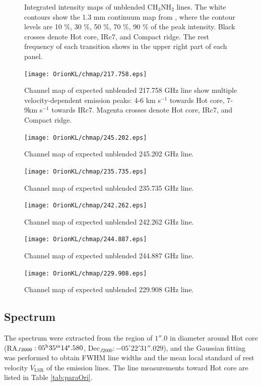 \begin{figure}[H]
\begin{center}
\caption{Integrated intensity maps of unblended CH$_{3}$NH$_{2}$ lines. 
The white contours show the 1.3 mm continuum map from \citet{Hirota+2015},
where the contour levels are 10 \%, 30 \%, 50 \%, 70 \%, 90 \% of the peak intensity.
Black crosses denote Hot core, IRc7, and Compact ridge. 
The rest frequency of each transition shows in the upper right part of each panel.}
\end{center}
\end{figure}

\begin{figure}[H]
  \centering
  \texttt{[image: OrionKL/chmap/217.758.eps]}
  \caption{
  Channel map of expected unblended 217.758 GHz line show multiple velocity-dependent 
  emission peaks: 4-6 km s$^{-1}$ towards Hot core, 7-9km s$^{-1}$ towards IRc7. 
  Magenta crosses denote Hot core, IRc7, and Compact ridge.}
  \label{ch_0}
\end{figure}

\begin{figure}[H]
  \centering
  \texttt{[image: OrionKL/chmap/245.202.eps]}
  \caption{Channel map of expected unblended 245.202 GHz line.}
  \label{ch_1}
\end{figure}

\begin{figure}[H]
  \centering
  \texttt{[image: OrionKL/chmap/235.735.eps]}
  \caption{Channel map of expected unblended 235.735 GHz line.}
  \label{ch_2}
\end{figure}

\begin{figure}[H]
  \centering
  \texttt{[image: OrionKL/chmap/242.262.eps]}
  \caption{Channel map of expected unblended 242.262 GHz line.}
  \label{ch_3}
\end{figure}

\begin{figure}[H]
  \centering
  \texttt{[image: OrionKL/chmap/244.887.eps]}
  \caption{Channel map of expected unblended 244.887 GHz line.}
  \label{ch_5}
\end{figure}

\begin{figure}[H]
  \centering
  \texttt{[image: OrionKL/chmap/229.908.eps]}
  \caption{Channel map of expected unblended 229.908 GHz line.}
  \label{ch_7}
\end{figure}

\newpage
\subsection{Spectrum}
The spectrum were extracted from the region of $1''.0$ in diameter around 
Hot core (RA$_{J2000}: 05^{\rm{h}}35^{\rm{m}}14^{\rm{s}}.580$, Dec$_{J2000}:-05^{\circ}22'31''.029$), 
and the Gaussian fitting was performed to obtain FWHM line widths and the mean local standard of 
rest velocity $V_{\mathrm{LSR}}$ of the emission lines.
The line measurements toward Hot core are listed in Table \ref{tab:paraOri}.


